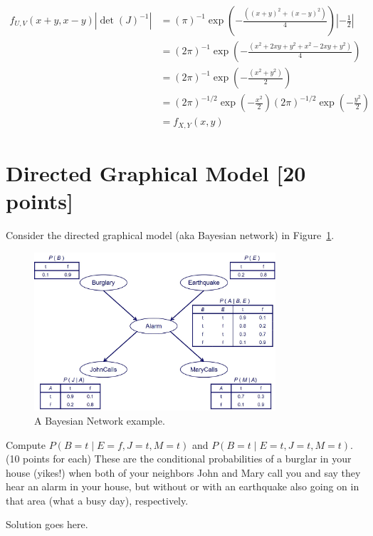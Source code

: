 \documentclass[a4paper]{article}
\theoremstyle{definition}
\newenvironment{soln}{
	\leavevmode\color{blue}\ignorespaces
}{}
\begin{document}
\begin{enumerate}[label=(\alph*)]
		\begin{soln}
			$$ \begin{aligned}
				f_{U,V}(x+y, x-y)|\det(J)^{-1}| & = (\pi)^{-1}\exp\left(-\frac{((x+y)^2+(x-y)^2)}{4}\right) |-\frac{1}{2}| \\
				& = (2\pi)^{-1}\exp\left(-\frac{(x^2+2xy+y^2+x^2-2xy+y^2)}{4}\right) \\
				& = (2\pi)^{-1}\exp\left(-\frac{(x^2+y^2)}{2}\right) \\
				& = (2\pi)^{-1/2}\exp\left(-\frac{x^2}{2}\right) (2\pi)^{-1/2}\exp\left(-\frac{y^2}{2}\right) \\
				& = f_{X,Y}(x, y)
			\end{aligned} $$
		\end{soln}
	\end{enumerate}

\section{Directed Graphical Model [20 points]}
Consider the directed graphical model (aka Bayesian network) in Figure~\ref{fig:bn}.
\begin{figure}[H]
    \centering
    \includegraphics[width=0.8\textwidth]{BN.jpg}
    \caption{A Bayesian Network example.}
    \label{fig:bn}
\end{figure}
Compute $P(B=t \mid E=f,J=t,M=t)$ and $P(B=t \mid E=t,J=t,M=t)$. (10 points for each) These are the conditional probabilities of a burglar in your house (yikes!) when both of your neighbors John and Mary call you and say they hear an alarm in your house, but without or with an earthquake also going on in that area (what a busy day), respectively.

\begin{soln}  Solution goes here. \end{soln}
\end{document}
